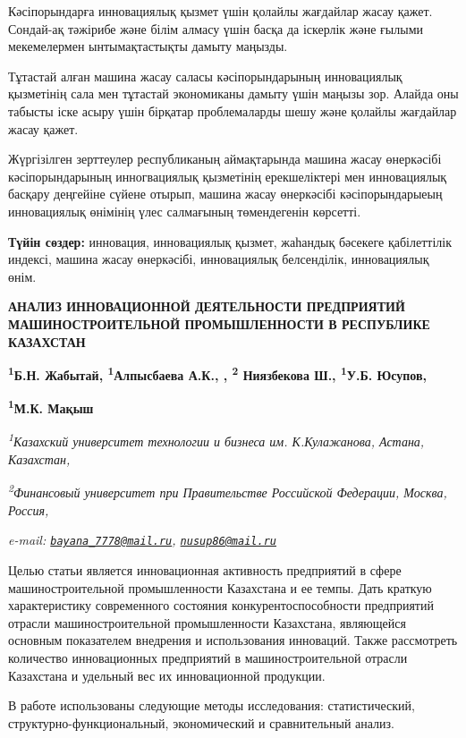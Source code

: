 Кәсіпорындарға инновациялық қызмет үшін қолайлы жағдайлар жасау қажет.
Сондай-ақ тәжірибе және білім алмасу үшін басқа да іскерлік және ғылыми
мекемелермен ынтымақтастықты дамыту маңызды.

Тұтастай алған машина жасау саласы кәсіпорындарының инновациялық
қызметінің сала мен тұтастай экономиканы дамыту үшін маңызы зор. Алайда
оны табысты іске асыру үшін бірқатар проблемаларды шешу және қолайлы
жағдайлар жасау қажет.

Жүргізілген зерттеулер республиканың аймақтарында машина жасау
өнеркәсібі кәсіпорындарының инногвациялық қызметінің ерекшеліктері мен
инновациялық басқару деңгейіне сүйене отырып, машина жасау өнеркәсібі
кәсіпорындарыеың инновациялық өнімінің үлес салмағының төмендегенін
көрсетті.

{\bfseries Түйін сөздер:} инновация, инновациялық қызмет, жаһандық бәсекеге
қабілеттілік индексі, машина жасау өнеркәсібі, инновациялық белсенділік,
инновациялық өнім.

{\bfseries АНАЛИЗ ИННОВАЦИОННОЙ ДЕЯТЕЛЬНОСТИ ПРЕДПРИЯТИЙ МАШИНОСТРОИТЕЛЬНОЙ
ПРОМЫШЛЕННОСТИ В РЕСПУБЛИКЕ КАЗАХСТАН}

{\bfseries \textsuperscript{1}Б.Н. Жабытай\textsuperscript{\envelope },
\textsuperscript{1}Алпысбаева А.К., , \textsuperscript{2} Ниязбекова Ш.,
\textsuperscript{1}У.Б. Юсупов\textsuperscript{\envelope },}

{\bfseries \textsuperscript{1}М.К. Мақыш}

\emph{\textsuperscript{1}Казахский университет технологии и бизнеса им.
К.Кулажанова, Астана, Казахстан,}

\emph{\textsuperscript{2}Финансовый университет при Правительстве
Российской Федерации, Москва, Россия,}

\emph{e-mail:
\href{mailto:bayana_7778@mail.ru}{\nolinkurl{bayana\_7778@mail.ru}},
\href{mailto:nusup86@mail.ru}{\nolinkurl{nusup86@mail.ru}}}

Целью статьи является инновационная активность предприятий в сфере
машиностроительной промышленности Казахстана и ее темпы. Дать краткую
характеристику современного состояния конкурентоспособности предприятий
отрасли машиностроительной промышленности Казахстана, являющейся
основным показателем внедрения и использования инноваций. Также
рассмотреть количество инновационных предприятий в машиностроительной
отрасли Казахстана и удельный вес их инновационной продукции.

В работе использованы следующие методы исследования: статистический,
структурно-функциональный, экономический и сравнительный анализ.

